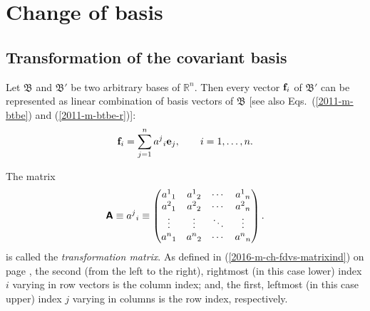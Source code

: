 

\section{Change of basis}
\label{2016-m-tensor-cob}



\subsection{Transformation of the covariant basis}

Let
${\mathfrak B}$
and
${\mathfrak B'}$
be two arbitrary bases of
$\mathbb{R}^n$.
Then every vector ${\bf f}_i$ of
${\mathfrak B'}$
can be represented as linear combination of basis vectors of
${\mathfrak B}$ [see also Eqs.~(\ref{2011-m-btbe}) and (\ref{2011-m-btbe-r})]:
\begin{equation}
{\bf f}_i=\sum_{j=1}^n {a^j}_i {\bf e}_j, \qquad i=1,\ldots , n
.
\label{2001-mu-tensors}
\end{equation}

The matrix
\begin{equation}
\textsf{\textbf{A}}
\equiv {a^j}_i \equiv
\begin{pmatrix}
{a^1}_1&{a^1}_2& \cdots & {a^1}_n\\
{a^2}_1&{a^2}_2& \cdots & {a^2}_n\\
\vdots &\vdots & \ddots & \vdots \\
{a^n}_1&{a^n}_2& \cdots & {a^n}_n
\end{pmatrix}
.
\label{2016-m-ch-tensor-tm}
\end{equation}
is called the {\em transformation matrix}.
As defined in (\ref{2016-m-ch-fdvs-matrixind}) on page \pageref{2016-m-ch-fdvs-matrixind},
the second (from the left to the right), rightmost (in this case lower) index $i$ varying in row vectors is the column index;
and, the first, leftmost (in this case upper) index $j$  varying in columns is the row index, respectively.


